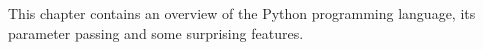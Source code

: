 This chapter contains an overview of the Python programming language, its parameter passing and some surprising features.
